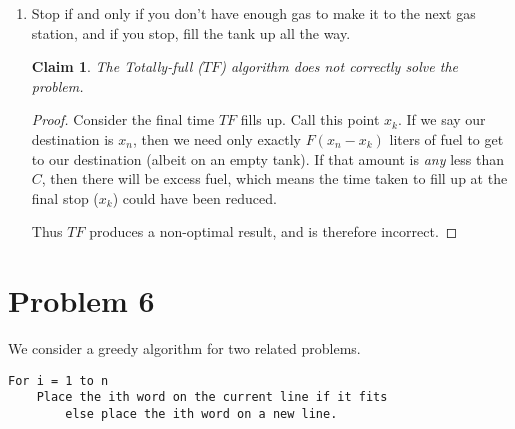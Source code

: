 \documentclass{article}
\newtheorem{thm}{Claim}
\providecommand{\prob}[1]{\section*{Problem #1}}
\begin{document}
\begin{enumerate}[label=(\alph*)]
\begin{proof}
            The only difference between the two is the $Opt'(I)$ agrees with $FAYG(I)$ for one more step than does $Opt(I)$.
            This is a contradiction on the maximal agreement between $Opt$ and $FAYG$.
            For this reason, $FAYG$ is optimal.
            
        \end{proof}
        
        
        \item Stop if and only if you don't have enough gas to make it to the next gas station, and if you stop, fill the tank up all the way.
        
        \begin{thm}
        	The Totally-full ($TF$) algorithm does not correctly solve the problem.
        \end{thm}
        
        \begin{proof}
        	Consider the final time $TF$ fills up.
        	Call this point $x_k$.
        	If we say our destination is $x_n$, then we need only exactly $F(x_n - x_k)$ liters of fuel to get to our destination (albeit on an empty tank).
        	If that amount is \emph{any} less than $C$, then there will be excess fuel, which means the time taken to fill up at the final stop ($x_k$) could have been reduced.
        	
        	Thus $TF$ produces a non-optimal result, and is therefore incorrect.
		\end{proof}
    \end{enumerate}
    

    \prob{6}
    We consider a greedy algorithm for two related problems.
    
    \begin{lstlisting}
For i = 1 to n
    Place the ith word on the current line if it fits
        else place the ith word on a new line.
    \end{lstlisting}
    
\end{document}

